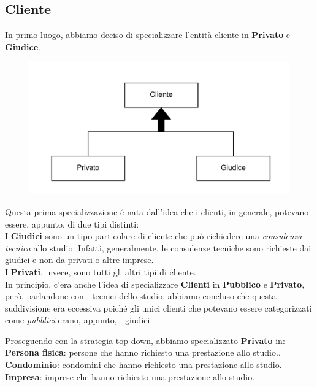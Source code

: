 \documentclass{elegantbook}
\begin{document}
			\newpage
            \subsection{Cliente}
            In primo luogo, abbiamo deciso di specializzare l'entità cliente in \textbf{Privato} e \textbf{Giudice}.
            
            \begin{figure}[H]
                \includegraphics[scale=0.4]{../Img/DBSchemes/cliente-1.png} 
            \end{figure}
            
            Questa prima specializzazione é nata dall'idea che i clienti, in generale, potevano essere, appunto, di due tipi distinti:\\
            I \textbf{Giudici} sono un tipo particolare di cliente che può richiedere una \textit{consulenza tecnica} allo studio. Infatti, generalmente, le consulenze tecniche sono richieste
            dai giudici e non da privati o altre imprese.\\
            I \textbf{Privati}, invece, sono tutti gli altri tipi di cliente.\\

            In principio, c'era anche l'idea di specializzare \textbf{Clienti} in \textbf{Pubblico} e \textbf{Privato}, però, parlandone con i tecnici dello studio, abbiamo concluso che questa suddivisione
            era eccessiva poiché gli unici clienti che potevano essere categorizzati come \textit{pubblici} erano, appunto, i giudici.

            Proseguendo con la strategia top-down, abbiamo specializzato \textbf{Privato} in:\\
            \textbf{Persona fisica}: persone che hanno richiesto una prestazione allo studio..
            \textbf{Condominio}: condomini che hanno richiesto una prestazione allo studio.
            \textbf{Impresa}: imprese che hanno richiesto una prestazione allo studio.
\end{document}
